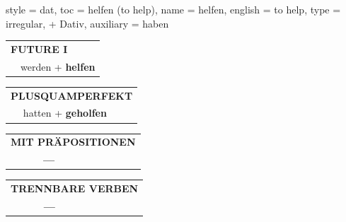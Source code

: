 \begin{verbentry}{
  style = {dat},
  toc = {helfen (to help)},
  name = {helfen},
  english = {to help},
  type = {irregular, + Dativ},
  auxiliary = {haben}
}
\begin{tabular}{rl}
    \multicolumn{2}{l}{\textbf{FUTURE I} }\\
   & werden + \textbf{helfen}\\
 
  \end{tabular}
\hfill
   \begin{tabular}{rl}
      \multicolumn{2}{l}{\textbf{PLUSQUAMPERFEKT}}\\
   & hatten + \textbf{geholfen}\\
  \end{tabular}
  
  
\vspace{10pt}

\begin{tabular}{lll}
\multicolumn{3}{l}{\textbf{MIT PRÄPOSITIONEN}}\\
& \textbf{---} & \\
\end{tabular}
\hfill
\begin{tabular}{lll}
\multicolumn{3}{l}{\textbf{TRENNBARE VERBEN}}\\
& \textbf{---} & \\
\end{tabular}
\vspace{-5pt}
\end{verbentry}

